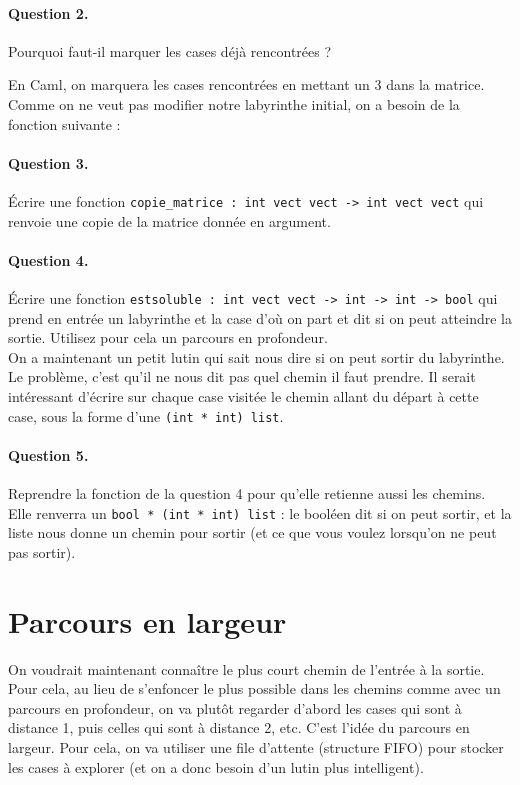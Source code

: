\documentclass[10pt,a4paper]{article}
\begin{document}
\paragraph{Question 2.} Pourquoi faut-il marquer les cases déjà rencontrées ?

En Caml, on marquera les cases rencontrées en mettant un 3 dans la matrice.
Comme on ne veut pas modifier notre labyrinthe initial, on a besoin de la
fonction suivante :
\paragraph{Question 3.} Écrire une fonction \texttt{copie\_matrice : int vect vect -> int vect vect} qui renvoie
une copie de la matrice donnée en argument.

\paragraph{Question 4.} Écrire une fonction
\texttt{estsoluble : int vect vect -> int -> int -> bool} qui prend en entrée un
labyrinthe et la case d'où on part et dit si on peut atteindre la sortie.
Utilisez pour cela un parcours en profondeur.
\\

On a maintenant un petit lutin qui sait nous dire si on peut sortir du
labyrinthe. Le problème, c'est qu'il ne nous dit pas quel chemin il faut
prendre. Il serait intéressant d'écrire sur chaque case visitée
le chemin allant du départ à cette case, sous la forme d'une \texttt{(int * int) list}.

\paragraph{Question 5.} Reprendre la fonction de la question 4 pour qu'elle
retienne aussi les chemins. Elle renverra un \texttt{bool * (int * int) list} : le booléen dit si on peut sortir,
et la liste nous donne un chemin pour sortir (et ce que vous voulez lorsqu'on ne
peut pas sortir).

\section{Parcours en largeur}
On voudrait maintenant connaître le plus court chemin de l'entrée à la sortie.
Pour cela, au lieu de s'enfoncer le plus possible dans les chemins comme avec
un parcours en profondeur, on va plutôt regarder d'abord les cases qui sont
à distance 1, puis celles qui sont à distance 2, etc. C'est l'idée du parcours
en largeur. Pour cela, on va utiliser une file d'attente (structure FIFO) pour
stocker les cases à explorer (et on a donc besoin d'un lutin plus intelligent).
\end{document}
